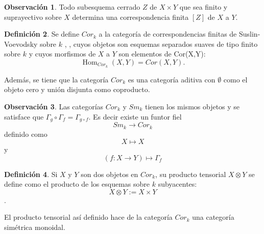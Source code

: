 \documentclass[10pt]{amsart}
\theoremstyle{definition}
\newtheorem{definition}{Definici\'on}[section]
\newtheorem{obs}[definition]{Observaci\'on}
\theoremstyle{remark}
\theoremstyle{definition}
\begin{document}
\begin{obs}
Todo subesquema cerrado $Z$ de $X \times Y$ que sea finito y suprayectivo sobre $X$ determina una correspondencia finita $[Z]$ de $X$ a $Y$.
\end{obs}

\begin{definition} Se define  $Cor_{k}$ a la categoría de correspondencias finitas de Suslin-Voevodsky sobre $k$ \cite{SV00}, \cite{Sus17}, cuyos objetos son esquemas separados suaves de tipo finito sobre $\mathit{k}$ y cuyos morfismos de $X$ a $Y$ son elementos de Cor(X,Y):
\begin{equation*}
\operatorname{Hom}_{{Cor}_{k}}(X,Y)=Cor(X,Y).
\end{equation*}
\end{definition}
Además, se tiene que la categoría $Cor_{k}$ es una categoría aditiva con $\emptyset$ como el objeto cero y unión disjunta como coproducto.


\begin{obs}
Las categorías $Cor_{\mathit{k}}$ y $Sm_{\mathit{k}}$ tienen los mismos objetos y se satisface que $\Gamma_{g} \circ \Gamma_{f}=\Gamma_{g \circ f}$. Es decir existe un funtor fiel 
\begin{equation*}
Sm_{\mathit{k}} \rightarrow Cor_{\mathit{k}}
\end{equation*}
definido como
\begin{equation*}
X \mapsto X
\end{equation*}
 y 
\begin{equation*}
(f:X \rightarrow Y) \mapsto \Gamma_{f}
\end{equation*}
\end{obs}


\begin{definition}
Si $X$ y $Y$ son dos objetos en $Cor_{\mathit{k}}$, su producto tensorial $X \otimes Y$ se define como el producto de los esquemas sobre $\mathit{k}$ subyacentes:
\begin{equation*}
X \otimes Y := X \times Y
\end{equation*}.
\end{definition}

El producto tensorial así definido hace de la categoría $Cor_{\mathit{k}}$ una categoría simétrica monoidal.
\end{document}
